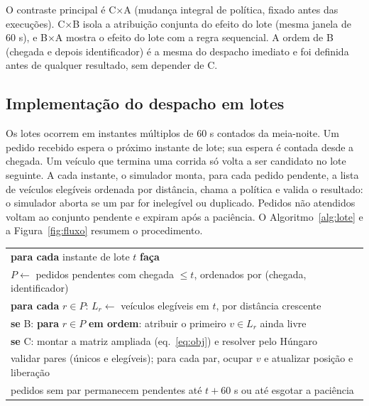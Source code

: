 O contraste principal é C×A (mudança integral de política, fixado antes das execuções). C×B isola a atribuição conjunta do efeito do lote (mesma janela de 60 s), e B×A mostra o efeito do lote com a regra sequencial. A ordem de B (chegada e depois identificador) é a mesma do despacho imediato e foi definida antes de qualquer resultado, sem depender de C.

\subsection{Implementação do despacho em lotes}

Os lotes ocorrem em instantes múltiplos de 60 s contados da meia-noite. Um pedido recebido espera o próximo instante de lote; sua espera é contada desde a chegada. Um veículo que termina uma corrida só volta a ser candidato no lote seguinte. A cada instante, o simulador monta, para cada pedido pendente, a lista de veículos elegíveis ordenada por distância, chama a política e valida o resultado: o simulador aborta se um par for inelegível ou duplicado. Pedidos não atendidos voltam ao conjunto pendente e expiram após a paciência. O Algoritmo~\ref{alg:lote} e a Figura~\ref{fig:fluxo} resumem o procedimento.

\begin{algoritmo}[!htb]
\caption{Despacho em lotes de 60 s (políticas B e C)}\label{alg:lote}
\fontetabela
\begin{tabular}{@{}l@{}}
\textbf{para cada} instante de lote $t$ \textbf{faça} \\
\quad $P \leftarrow$ pedidos pendentes com chegada $\le t$, ordenados por (chegada, identificador) \\
\quad \textbf{para cada} $r\in P$: $L_r \leftarrow$ veículos elegíveis em $t$, por distância crescente \\
\quad \textbf{se} B: \textbf{para} $r\in P$ \textbf{em ordem}: atribuir o primeiro $v\in L_r$ ainda livre \\
\quad \textbf{se} C: montar a matriz ampliada (eq.~\ref{eq:obj}) e resolver pelo Húngaro \\
\quad validar pares (únicos e elegíveis); para cada par, ocupar $v$ e atualizar posição e liberação \\
\quad pedidos sem par permanecem pendentes até $t+60$ s ou até esgotar a paciência \\
\end{tabular}
\end{algoritmo}

